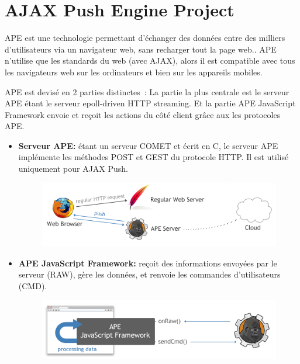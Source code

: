 \documentclass[a4paper,10pt]{report}
\begin{document}
  \section{AJAX Push Engine Project}
APE est une technologie permettant d'échanger des données entre des milliers d'utilisateurs via un navigateur web, sans recharger tout la page web.. APE n’utilise que les standards du web (avec AJAX), alors il est compatible avec tous les navigateurs web sur les ordinateurs et bien sur les appareils mobiles.


APE est devisé en 2 parties distinctes : La partie la plus centrale est le serveur APE  étant le serveur epoll-driven HTTP streaming. Et la partie APE JavaScript Framework envoie et reçoit les actions du côté client grâce aux les protocoles APE.

\begin{itemize}

 \item \textbf{Serveur APE:} étant un serveur COMET et écrit en C, le serveur APE implémente les méthodes POST et GEST du protocole HTTP. Il est utilisé uniquement pour AJAX Push.
  \begin{figure}[!ht]
    \centering
    \includegraphics[scale=0.6, bb=0 0 497 136]{img/APEServeur.png} 
  \end{figure} 
 \item \textbf{APE JavaScript Framework:} reçoit des informations envoyées par le serveur (RAW), gère les données, et renvoie les commandes d’utilisateurs (CMD).
  \begin{figure}[!ht]
    \centering
    \includegraphics[scale=0.6, bb=0 0 500 127]{img/APEFramework.png} 
  \end{figure} 
\end{itemize}
\end{document}
